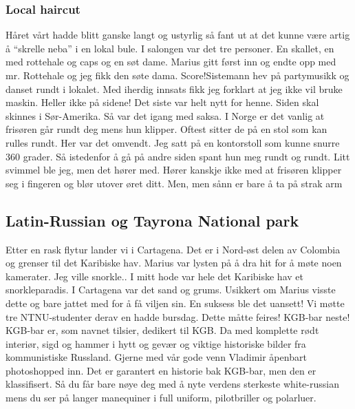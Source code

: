 \subsubsection{Local haircut}

Håret vårt hadde blitt ganske langt og ustyrlig så fant ut  at det
kunne være artig å ``skrelle neba'' i en lokal bule. I salongen var
det tre personer. En skallet, en med rottehale og caps og en søt dame.
Marius gitt først inn og endte opp med mr. Rottehale og jeg fikk den søte
dama. Score!Sistemann hev på partymusikk og danset rundt i lokalet. Med
iherdig innsats fikk jeg forklart at jeg ikke vil bruke maskin. Heller
ikke på sidene! Det siste var helt nytt for henne. Siden skal skinnes
i Sør-Amerika. Så var det igang med saksa. I Norge er det vanlig at
frisøren går rundt deg mens hun klipper. Oftest sitter de på en stol
som kan rulles rundt. Her var det omvendt. Jeg satt på en kontorstoll
som kunne snurre 360 grader. Så istedenfor å gå på andre siden spant
hun meg rundt og rundt. Litt svimmel ble jeg, men det hører med.
Hører kanskje ikke med at frisøren klipper seg i fingeren og blør
utover øret ditt. Men, men sånn er bare å ta på strak arm

\subsection{Latin-Russian og Tayrona National park}

Etter en rask flytur lander vi i Cartagena. Det er i Nord-øst delen
av Colombia og grenser til det Karibiske hav. Marius var lysten på å
dra hit for å møte noen kamerater. Jeg ville snorkle.. I mitt hode var hele det Karibiske hav et snorkleparadis. I
Cartagena var det sand og grums. Usikkert om Marius visste dette og
bare jattet med for å få viljen sin. En suksess ble det uansett! Vi møtte tre NTNU-studenter derav en
hadde bursdag. Dette måtte feires! KGB-bar neste! KGB-bar er, som
navnet tilsier, dedikert til KGB. Da med komplette rødt interiør,
sigd og hammer i hytt og gevær og viktige historiske bilder fra
kommunistiske Russland. Gjerne med vår gode venn Vladimir åpenbart
photoshopped inn. Det er garantert en historie bak KGB-bar, men den er
klassifisert. Så du får bare nøye deg med å nyte verdens sterkeste
white-russian mens du ser på langer manequiner i full uniform,
pilotbriller og polarluer. 



